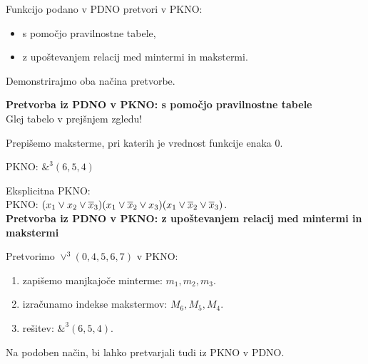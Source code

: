 \begin{zgled}
Funkcijo podano v PDNO pretvori v PKNO:
\begin{itemize}
\item s pomočjo pravilnostne tabele,
\item z upoštevanjem relacij med mintermi in makstermi.
\end{itemize}
\end{zgled}
\begin{resitev}
Demonstrirajmo oba načina pretvorbe.

\textbf{Pretvorba iz PDNO v PKNO: s pomočjo pravilnostne tabele} \\
Glej tabelo v prejšnjem zgledu!

Prepišemo maksterme, pri katerih je vrednost funkcije enaka 0.

\hspace*{5mm} PKNO: $\&^3(6,5,4)$

Eksplicitna PKNO: \\
\hspace*{5mm} PKNO: $(x_1 \vee x_2 \vee \overline x_3) (x_1 \vee \overline x_2 \vee x_3) (x_1 \vee \overline x_2 \vee \overline x_3)$.\\

\textbf{Pretvorba iz PDNO v PKNO: z upoštevanjem relacij med mintermi in makstermi}

Pretvorimo $\vee^3(0,4,5,6,7)$ v PKNO:
\begin{enumerate}
\item zapišemo manjkajoče minterme: $m_1,m_2,m_3$.
\item izračunamo indekse makstermov: $M_6, M_5, M_4$.
\item rešitev: $\&^3(6,5,4)$.
\end{enumerate}

Na podoben način, bi lahko pretvarjali tudi iz PKNO v PDNO.

\end{resitev}


